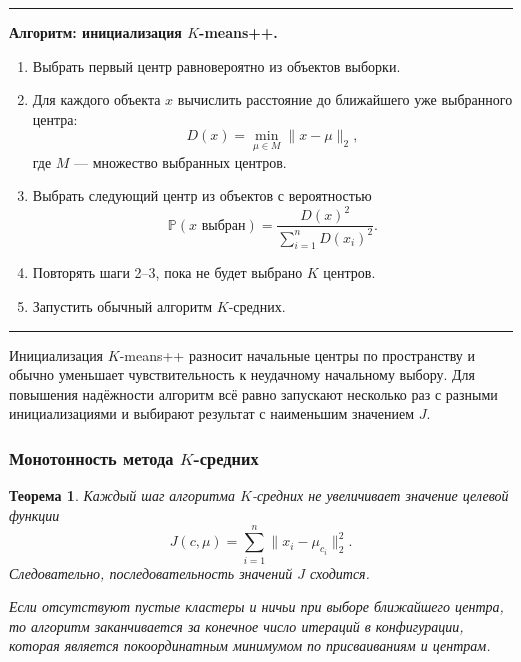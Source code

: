 \documentclass[12pt,a4paper]{article}
\newtheorem{theorem}{Теорема}[section]
\theoremstyle{definition}
\theoremstyle{remark}
\newcommand{\PP}{\mathbb{P}}
\newenvironment{algorithmbox}[1]
{
    \begin{center}
    \begin{minipage}{0.96\textwidth}
    \hrule
    \medskip
    \textbf{Алгоритм: #1.}
    \par\smallskip
}
{
    \medskip
    \hrule
    \end{minipage}
    \end{center}
}
\begin{document}
\begin{algorithmbox}{инициализация $K$-means++}
\begin{enumerate}
    \item Выбрать первый центр равновероятно из объектов выборки.
    \item Для каждого объекта $x$ вычислить расстояние до ближайшего уже
          выбранного центра:
          \[
              D(x)
              =
              \min_{\mu\in M}\|x-\mu\|_2,
          \]
          где $M$ --- множество выбранных центров.
    \item Выбрать следующий центр из объектов с вероятностью
          \[
              \PP(x\text{ выбран})
              =
              \frac{D(x)^2}{
                  \sum_{i=1}^{n}D(x_i)^2
              }.
          \]
    \item Повторять шаги 2--3, пока не будет выбрано $K$ центров.
    \item Запустить обычный алгоритм $K$-средних.
\end{enumerate}
\end{algorithmbox}

Инициализация $K$-means++ разносит начальные центры по пространству и обычно
уменьшает чувствительность к неудачному начальному выбору. Для повышения
надёжности алгоритм всё равно запускают несколько раз с разными
инициализациями и выбирают результат с наименьшим значением $J$.

\subsubsection{Монотонность метода $K$-средних}

\begin{theorem}
Каждый шаг алгоритма $K$-средних не увеличивает значение целевой функции
\[
    J(c,\mu)
    =
    \sum_{i=1}^{n}\|x_i-\mu_{c_i}\|_2^2.
\]
Следовательно, последовательность значений $J$ сходится.

Если отсутствуют пустые кластеры и ничьи при выборе ближайшего центра, то
алгоритм заканчивается за конечное число итераций в конфигурации, которая
является покоординатным минимумом по присваиваниям и центрам.
\end{theorem}
\end{document}
